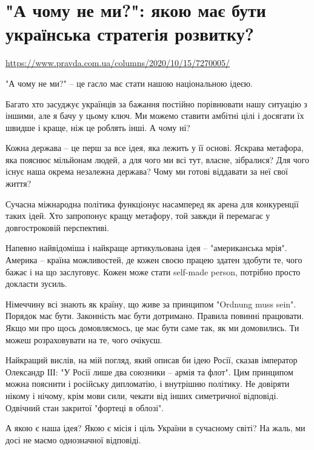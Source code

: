  
 

\section{"А чому не ми?": якою має бути українська стратегія розвитку? }

\url{https://www.pravda.com.ua/columns/2020/10/15/7270005/}

"А чому не ми?" – це гасло має стати нашою національною ідеєю. 

Багато хто засуджує українців за бажання постійно порівнювати нашу ситуацію з
іншими, але я бачу у цьому ключ. Ми можемо ставити амбітні цілі і досягати їх
швидше і краще, ніж це роблять інші. А чому ні? 

Кожна держава – це перш за все ідея, яка лежить у її основі. Яскрава метафора,
яка пояснює мільйонам людей, а для чого ми всі тут, власне, зібралися? Для чого
існує наша окрема незалежна держава? Чому ми готові віддавати за неї свої
життя? 

Сучасна міжнародна політика функціонує насамперед як арена для конкуренції
таких ідей. Хто запропонує кращу метафору, той завжди й перемагає у
довгостроковій перспективі.

Напевно найвідоміша і найкраще артикульована ідея – "американська мрія".
Америка – країна можливостей, де кожен своєю працею здатен здобути те, чого
бажає і на що заслуговує. Кожен може стати self-made person, потрібно просто
докласти зусиль. 

Німеччину всі знають як країну, що живе за принципом "Ordnung muss sein". Порядок має бути. Законність має бути дотримано. Правила повинні працювати. Якщо ми про щось домовляємось, це має бути саме так, як ми домовились. Ти можеш розраховувати на те, чого очікуєш. 

Найкращий вислів, на мій погляд, який описав би ідею Росії, сказав імператор
Олександр ІІІ: "У Росії лише два союзники – армія та флот". Цим принципом можна
пояснити і російську дипломатію, і внутрішню політику. Не довіряти нікому і
нічому, крім мови сили, чекати від інших симетричної відповіді. Одвічний стан
закритої "фортеці в облозі". 

А якою є наша ідея? Якою є місія і ціль України в сучасному світі? На жаль, ми
досі не маємо однозначної відповіді.

